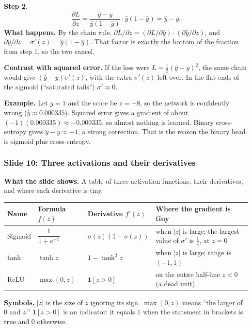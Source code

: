 \textbf{Step 2.}
\[
\frac{\partial L}{\partial z} = \frac{\hat{y}-y}{\hat{y}(1-\hat{y})}\cdot \hat{y}(1-\hat{y}) = \hat{y}-y.
\]
\textbf{What happens.} By the chain rule, $\partial L/\partial z = (\partial L/\partial\hat{y})\cdot(\partial\hat{y}/\partial z)$, and $\partial \hat{y}/\partial z = \sigma'(z) = \hat{y}(1-\hat{y})$. That factor is exactly the bottom of the fraction from step 1, so the two cancel.

\textbf{Contrast with squared error.} If the loss were $L=\tfrac12(\hat{y}-y)^2$, the same chain would give $(\hat{y}-y)\sigma'(z)$, with the extra $\sigma'(z)$ left over. In the flat ends of the sigmoid (``saturated tails'') $\sigma'\approx0$.

\textbf{Example.} Let $y=1$ and the score be $z=-8$, so the network is confidently wrong ($\hat{y}\approx 0.000335$). Squared error gives a gradient of about $(-1)(0.000335) \approx -0.000335$, so almost nothing is learned. Binary cross-entropy gives $\hat{y}-y\approx -1$, a strong correction. That is the reason the binary head is sigmoid plus cross-entropy.

\subsubsection{Slide 10: Three activations and their derivatives}

\textbf{What the slide shows.} A table of three activation functions, their derivatives, and where each derivative is tiny.

\begin{center}
\begin{tabular}{p{1.6cm}p{3.6cm}p{3.4cm}p{5.1cm}}
\toprule
Name & Formula $f(z)$ & Derivative $f'(z)$ & Where the gradient is tiny \\
\midrule
Sigmoid & $\dfrac{1}{1+e^{-z}}$ & $\sigma(z)(1-\sigma(z))$ & when $|z|$ is large; the largest value of $\sigma'$ is $\tfrac14$, at $z=0$ \\[0.8em]
tanh & $\tanh z$ & $1-\tanh^2 z$ & when $|z|$ is large; range is $(-1,1)$ \\[0.4em]
ReLU & $\max(0,z)$ & $\mathbf{1}[z>0]$ & on the entire half-line $z<0$ (a dead unit) \\
\bottomrule
\end{tabular}
\end{center}

\textbf{Symbols.} $|z|$ is the size of $z$ ignoring its sign. $\max(0,z)$ means ``the larger of 0 and $z$.'' $\mathbf{1}[z>0]$ is an indicator: it equals $1$ when the statement in brackets is true and $0$ otherwise.

